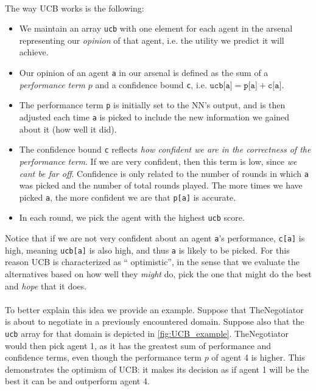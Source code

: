 \documentclass[12pt]{article}
\numberwithin{equation}{section}
\newcommand{\quotes}[1]{\textquotedblleft{} #1\textquotedblright}
\begin{document}
			\paragraph*{}
				The way UCB works is the following:
				\begin{itemize}
					\item We maintain an array \texttt{ucb} with one element for each agent in the arsenal representing our \emph{opinion} of that agent, i.e. the utility we predict it will achieve.

					\item Our opinion of an agent \texttt{a} in our arsenal is defined as the sum of a \emph{performance term} $p$ and a confidence bound \texttt{c}, i.e. $\texttt{ucb[a]} = \texttt{p[a]} + \texttt{c[a]}$.

					\item The performance term \texttt{p} is initially set to the NN's output, and is then adjusted each time \texttt{a} is picked to include the new information we gained about it (how well it did).
					
					\item The confidence bound \texttt{c} reflects \emph{how confident we are in the correctness of the performance term}. If we are very confident, then this term is low, since \emph{we cant be far off}. Confidence is only related to the number of rounds in which \texttt{a} was picked and the number of total rounds played. The more times we have picked \texttt{a}, the more confident we are that \texttt{p[a]} is accurate.

					\item In each round, we pick the agent with the highest \texttt{ucb} score.
				\end{itemize}
				Notice that if we are not very confident about an agent \texttt{a}'s performance, \texttt{c[a]} is high, meaning \texttt{ucb[a]} is also high, and thus \texttt{a} is likely to be picked. For this reason UCB is characterized as \quotes{optimistic}, in the sense that we evaluate the alternatives based on how well they \emph{might} do, pick the one that might do the best and \emph{hope} that it does.

			\paragraph*{}
				To better explain this idea we provide an example. Suppose that TheNegotiator is about to negotiate in a previously encountered domain. Suppose also that the \texttt{ucb} array for that domain is depicted in \cref{fig:UCB_example}. TheNegotiator would then pick agent 1, as it has the greatest sum of performance and confidence terms, even though the performance term $p$ of agent 4 is higher. This demonstrates the optimism of UCB: it makes its decision as if agent 1 will be the best it can be and outperform agent 4.
\end{document}
